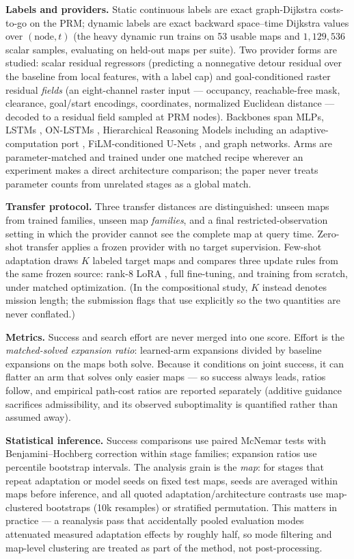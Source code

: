 \documentclass[11pt,letterpaper]{article}
\begin{document}
\textbf{Labels and providers.} Static continuous labels are exact graph-Dijkstra costs-to-go on the PRM; dynamic labels are exact backward space--time Dijkstra values over $(\text{node},t)$ (the heavy dynamic run trains on 53 usable maps and $1{,}129{,}536$ scalar samples, evaluating on held-out maps per suite). Two provider forms are studied: scalar residual regressors (predicting a nonnegative detour residual over the baseline from local features, with a label cap) and goal-conditioned raster residual \emph{fields} (an eight-channel raster input --- occupancy, reachable-free mask, clearance, goal/start encodings, coordinates, normalized Euclidean distance --- decoded to a residual field sampled at PRM nodes). Backbones span MLPs, LSTMs \citep{hochreiter1997lstm}, ON-LSTMs \citep{shen2019onlstm}, Hierarchical Reasoning Models \citep[HRMs;][]{wang2025hrm} including an adaptive-computation port \citep{graves2016act,banino2021pondernet}, FiLM-conditioned U-Nets \citep{ronneberger2015unet,perez2018film}, and graph networks. Arms are parameter-matched and trained under one matched recipe wherever an experiment makes a direct architecture comparison; the paper never treats parameter counts from unrelated stages as a global match.

\textbf{Transfer protocol.} Three transfer distances are distinguished: unseen maps from trained families, unseen map \emph{families}, and a final restricted-observation setting in which the provider cannot see the complete map at query time. Zero-shot transfer applies a frozen provider with no target supervision. Few-shot adaptation draws $K$ labeled target maps and compares three update rules from the same frozen source: rank-8 LoRA \citep{hu2021lora}, full fine-tuning, and training from scratch, under matched optimization. (In the compositional study, $K$ instead denotes mission length; the submission flags that use explicitly so the two quantities are never conflated.)

\textbf{Metrics.} Success and search effort are never merged into one score. Effort is the \emph{matched-solved expansion ratio}: learned-arm expansions divided by baseline expansions on the maps both solve. Because it conditions on joint success, it can flatter an arm that solves only easier maps --- so success always leads, ratios follow, and empirical path-cost ratios are reported separately (additive guidance sacrifices admissibility, and its observed suboptimality is quantified rather than assumed away).

\textbf{Statistical inference.} Success comparisons use paired McNemar tests with Benjamini--Hochberg correction within stage families; expansion ratios use percentile bootstrap intervals. The analysis grain is the \emph{map}: for stages that repeat adaptation or model seeds on fixed test maps, seeds are averaged within maps before inference, and all quoted adaptation/architecture contrasts use map-clustered bootstraps (10k resamples) or stratified permutation. This matters in practice --- a reanalysis pass that accidentally pooled evaluation modes attenuated measured adaptation effects by roughly half, so mode filtering and map-level clustering are treated as part of the method, not post-processing.
\end{document}

